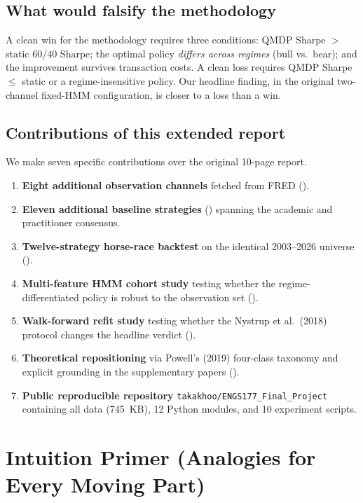 \documentclass[11pt]{article}
\theoremstyle{plain1}
\theoremstyle{definition1}
\newcommand{\1}{\mathbf{1}}
\begin{document}
\subsection{What would falsify the methodology}

A clean win for the methodology requires three conditions:
QMDP Sharpe $>$ static $60/40$ Sharpe; the optimal policy \emph{differs across regimes} (bull vs.\ bear); and the improvement survives transaction costs. A clean loss requires QMDP Sharpe $\leq$ static or a regime-insensitive policy. Our headline finding, in the original two-channel fixed-HMM configuration, is closer to a loss than a win.

\subsection{Contributions of this extended report}

We make seven specific contributions over the original 10-page report.
\begin{enumerate}[leftmargin=2em,itemsep=2pt]
  \item \textbf{Eight additional observation channels} fetched from FRED ().
  \item \textbf{Eleven additional baseline strategies} () spanning the academic and practitioner consensus.
  \item \textbf{Twelve-strategy horse-race backtest} on the identical 2003--2026 universe ().
  \item \textbf{Multi-feature HMM cohort study} testing whether the regime-differentiated policy is robust to the observation set ().
  \item \textbf{Walk-forward refit study} testing whether the Nystrup et al.\ (2018) protocol changes the headline verdict ().
  \item \textbf{Theoretical repositioning} via Powell's (2019) four-class taxonomy and explicit grounding in the supplementary papers ().
  \item \textbf{Public reproducible repository} \texttt{takakhoo/ENGS177\_Final\_Project} containing all data (745~KB), 12 Python modules, and 10 experiment scripts.
\end{enumerate}

\section{Intuition Primer (Analogies for Every Moving Part)}\label{sec:intuition}
\end{document}
